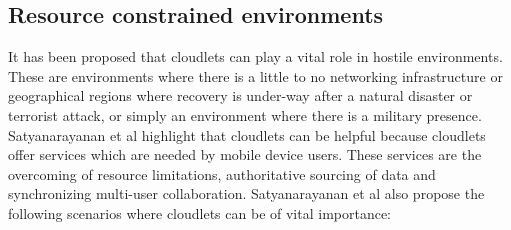 \subsection{Resource constrained environments}
It has been proposed that cloudlets can play a vital role in hostile environments\cite{RefWorks:107}. These are environments
where there is a little to no networking infrastructure or geographical regions where recovery is under-way after a natural disaster or terrorist attack, or simply an environment where there is a military presence. Satyanarayanan et al\cite{RefWorks:107} highlight that cloudlets can be helpful because cloudlets offer services which are needed by mobile device users. These
services are the overcoming of resource limitations, authoritative sourcing of data and synchronizing multi-user collaboration. Satyanarayanan et al\cite{RefWorks:107} also propose the following scenarios where cloudlets can be of vital importance:

